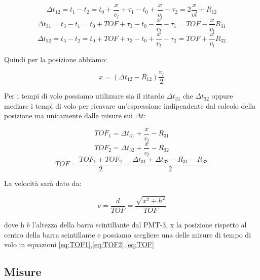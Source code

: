 \documentclass[a4paper]{article}
\begin{document}
\begin{equation}
\Delta t_{12} = t_1 - t_2 = t_0 + \frac{x}{v_l} + \tau_1 - t_0 + \frac{x}{v_l} - \tau_2 = 2\frac{x}{vl} + R_{12}
\end{equation}
\begin{equation}
\Delta t_{31} = t_3 - t_1 = t_0 + TOF + \tau_3 - t_0 - \frac{x}{v_l} - \tau_1 = TOF - \frac{x}{v_l} R_{31}
\end{equation}
\begin{equation}
\Delta t_{32} = t_3 - t_2 = t_0 + TOF + \tau_3 - t_0 + \frac{x}{v_l} - \tau_2 = TOF + \frac{x}{v_l} R_{32}
\end{equation}

Quindi per la posizione abbiamo:

\begin{equation}
x = (\Delta t_{12} - R_{12})\frac{v_l}{2}
\label{eq:PosX}
\end{equation}

Per i tempi di volo possiamo utilizzare sia il ritardo $\Delta t_{31}$ che $\Delta t_{32}$ oppure mediare i tempi di volo per ricavare un'espressione indipendente dal calcolo della posizione ma unicamente dalle misure sui $\Delta t$:

\begin{equation}
TOF_1 = \Delta t_{31} + \frac{x}{v_l} - R_{31}
\label{eq:TOF1}
\end{equation}
\begin{equation}
TOF_2 = \Delta t_{32} + \frac{x}{v_l} - R_{32}
\label{eq:TOF2}
\end{equation}
\begin{equation}
TOF = \frac{TOF_1 + TOF_2}{2} = \frac{\Delta t_{31} + \Delta t_{32} - R_{31} - R_{32}}{2}
\label{eq:TOF}
\end{equation}

La velocità sarà dato da:

\begin{equation}
v = \frac{d}{TOF} = \frac{\sqrt{x^2+h^2}}{TOF}
\label{eq:VMu}
\end{equation}

dove h è l'altezza della barra scintillante dal PMT-3, x la posizione rispetto al centro della barra scintillante e possiamo scegliere una delle misure di tempo di volo in equazioni \ref{eq:TOF1},\ref{eq:TOF2},\ref{eq:TOF}

\subsection{Misure}
\label{sec:MisureV}
\end{document}
